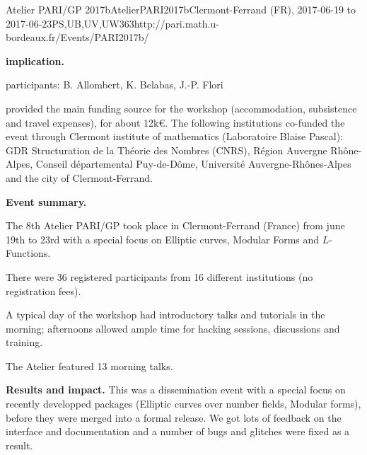 \begin{event}{Atelier PARI/GP 2017b}{AtelierPARI2017b}{Clermont-Ferrand (FR),
2017-06-19 to 2017-06-23}{PS,UB,UV,UW}{36}{3}{http://pari.math.u-bordeaux.fr/Events/PARI2017b/}


\textbf{\ODK implication.}

\ODK participants: B. Allombert, K. Belabas, J.-P. Flori

\ODK provided the main funding source for the workshop (accommodation,
subsistence and travel expenses), for about 12k\euro. The following
institutions co-funded the event through Clermont institute of mathematics
  (Laboratoire
  Blaise Pascal): GDR Structuration de la Théorie des Nombres (CNRS), Région
  Auvergne Rhône-Alpes, Conseil départemental Puy-de-Dôme, Université
  Auvergne-Rhônes-Alpes and the city of Clermont-Ferrand.

\textbf{Event summary.}

The 8th Atelier PARI/GP took place in Clermont-Ferrand (France) from june
19th to 23rd with a special focus on Elliptic curves, Modular Forms and
$L$-Functions.

There were 36 registered participants from 16 different institutions
(no registration fees).

A typical day of the workshop had introductory talks and tutorials
in the morning; afternoons allowed ample time for hacking sessions,
discussions and training.

The Atelier featured 13 morning talks.

\textbf{Results and impact.}
This was a dissemination event with a special focus on recently developped
packages (Elliptic curves over number fields, Modular forms), before they were
merged into a formal release. We got lots of feedback on the interface and
documentation and a number of bugs and glitches were fixed as a result.
\end{event}
